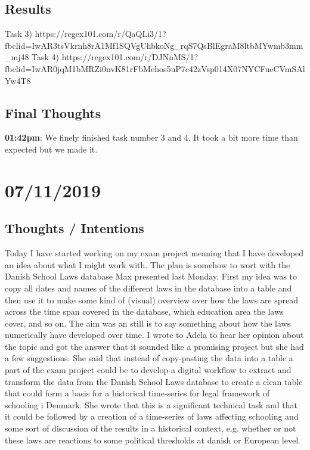 \documentclass{article}
\begin{document}
\subsection{Results}
Task 3) \newline
https://regex101.com/r/QaQLi3/1?fbclid=IwAR3tsVkrnh8rA1Mf1SQVgUhbkoNg_rqS7QsBlEgraM8ltbMYwmb3mm_mj48 \newline
Task 4) \newline 
https://regex101.com/r/DJNnMS/1?fbclid=IwAR0jqM1bMRZi0nvK81rFbMehos5uP7c42zVsp014X07NYCFueCVmSAlYw4T8

\subsection{Final Thoughts}
\textbf{01:42pm}: We finely finished task number 3 and 4. It took a bit more time than expected but we made it.  
\pagebreak{}

\section{07/11/2019}
\subsection{Thoughts / Intentions}
Today I have started working on my exam project meaning that I have developed an idea about what I might work with. The plan is somehow to wort with the Danish School Laws database Max presented last Monday. First my idea was to copy all dates and names of the different laws in the database into a table and then use it to make some kind of (visual) overview over how the laws are spread across the time span covered in the database, which education area the laws cover, and so on. The aim was an still is to say something about how the laws numerically have developed over time. I wrote to Adela to hear her opinion about the topic and got the answer that it sounded like a promising project but she had a few suggestions. She said that instead of copy-pasting the data into a table a part of the exam project could be to develop a digital workflow to extract and transform the data from the Danish School Laws database to create a clean table that could form a basis for a historical time-series for legal framework of schooling i Denmark. She wrote that this is a significant technical task and that it could be followed by a creation of a time-series of laws affecting schooling and some sort of discussion of the results in a historical context, e.g. whether or not these laws are reactions to some political thresholds at danish or European level.
\end{document}
